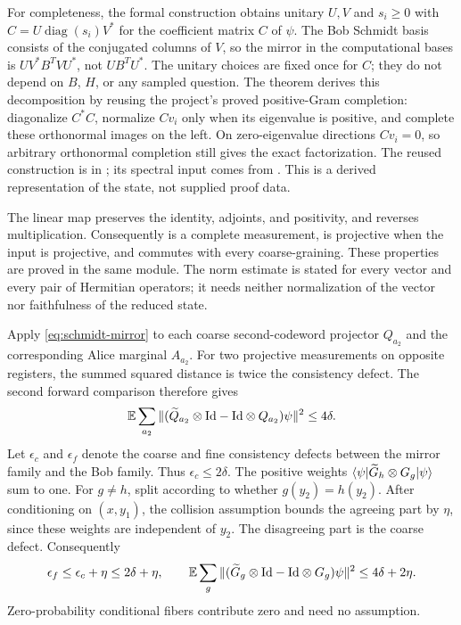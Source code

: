 \documentclass[11pt]{article}
\begin{document}
For completeness, the formal construction obtains unitary $U,V$ and
$s_i\geq0$ with $C=U\operatorname{diag}(s_i)V^*$ for the coefficient matrix
$C$ of $\psi$. The Bob Schmidt basis consists of the conjugated columns of
$V$, so the mirror in the computational bases is $UV^*B^TVU^*$, not
$UB^TU^*$. The unitary choices are fixed once for $C$; they do not depend on
$B$, $H$, or any sampled question. The theorem
 derives this decomposition by
reusing the project's proved positive-Gram completion: diagonalize $C^*C$,
normalize $Cv_i$ only when its eigenvalue is positive, and complete these
orthonormal images on the left. On zero-eigenvalue directions $Cv_i=0$, so
arbitrary orthonormal completion still gives the exact factorization.
The reused construction is in
;
its spectral input comes from
.
This is a derived representation of the state, not supplied proof data.

The linear map  preserves the identity, adjoints,
and positivity, and reverses multiplication. Consequently
 is a complete measurement, is projective
when the input is projective, and commutes with every coarse-graining.
These properties are proved in the same module. The norm estimate is stated
for every vector and every pair of Hermitian operators; it needs neither
normalization of the vector nor faithfulness of the reduced state.

Apply \eqref{eq:schmidt-mirror} to each coarse second-codeword projector
$Q_{a_2}$ and the corresponding Alice marginal $A_{a_2}$. For two projective
measurements on opposite registers, the summed squared distance is twice
the consistency defect. The second forward comparison therefore gives
\[
 \mathbb E\sum_{a_2}
 \|(\widetilde Q_{a_2}\otimes\mathrm{Id}-\mathrm{Id}\otimes Q_{a_2})\psi\|^2
 \leq4\delta.
\]
Let $\epsilon_c$ and $\epsilon_f$ denote the coarse and fine consistency
defects between the mirror family and the Bob family. Thus
$\epsilon_c\leq2\delta$. The positive weights
$\langle\psi|\widetilde G_h\otimes G_g|\psi\rangle$ sum to one.
For $g\neq h$, split according to whether $g(y_2)=h(y_2)$.
After conditioning on $(x,y_1)$, the collision assumption bounds the agreeing
part by $\eta$, since these weights are independent of $y_2$.
The disagreeing part is the coarse defect. Consequently
\[
 \epsilon_f\leq\epsilon_c+\eta\leq2\delta+\eta,
 \qquad
 \mathbb E\sum_g\|(\widetilde G_g\otimes\mathrm{Id}
                   -\mathrm{Id}\otimes G_g)\psi\|^2\leq4\delta+2\eta.
\]
Zero-probability conditional fibers contribute zero and need no assumption.
\end{document}
